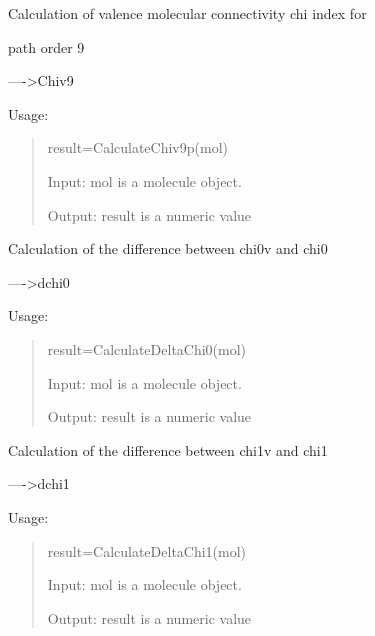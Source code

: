 \documentclass[letterpaper,10pt,english]{sphinxmanual}
\begin{document}

\begin{fulllineitems}
\label{reference/connectivity:connectivity.CalculateChiv9p}
Calculation of valence molecular connectivity chi index for

path order 9

----\textgreater{}Chiv9

Usage:
\begin{quote}

result=CalculateChiv9p(mol)

Input: mol is a molecule object.

Output: result is a numeric value
\end{quote}

\end{fulllineitems}


\begin{fulllineitems}
\label{reference/connectivity:connectivity.CalculateDeltaChi0}
Calculation of the difference between chi0v and chi0

----\textgreater{}dchi0

Usage:
\begin{quote}

result=CalculateDeltaChi0(mol)

Input: mol is a molecule object.

Output: result is a numeric value
\end{quote}

\end{fulllineitems}


\begin{fulllineitems}
\label{reference/connectivity:connectivity.CalculateDeltaChi1}
Calculation of the difference between chi1v and chi1

----\textgreater{}dchi1

Usage:
\begin{quote}

result=CalculateDeltaChi1(mol)

Input: mol is a molecule object.

Output: result is a numeric value
\end{quote}

\end{fulllineitems}
\end{document}
